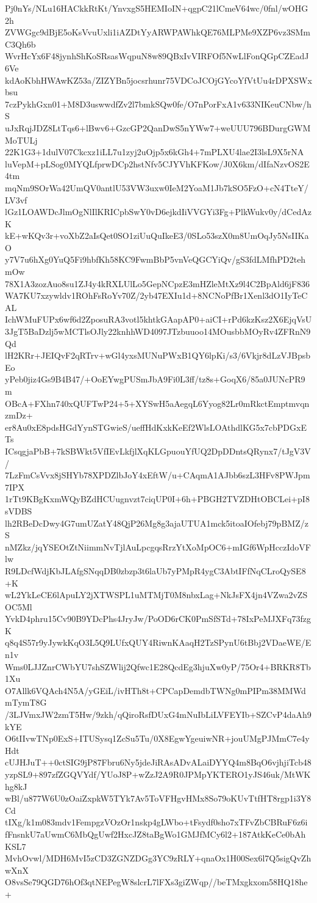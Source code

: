 Pj0nYs/NLu16HACkkRtKt/YnvxgS5HEMIoIN+qgpC21lCmeV64wc/0fnl/wOHG2h
ZVWGgc9dBjE5oKsVvuUxli1iAZDtYyARWPAWhkQE76MLPMe9XZP6vz3SMmC3Qh6b
WvrHcYx6F48jynhShKoSRsasWqpuN8w89QBxIvVIRFOf5NwLlFonQGpCZEadJ6Ve
kdAoKbhHWAwKZ53a/ZIZYBn5jocsrhunr75VDCoJCOjGYcoYfVtUu4rDPXSWxbsu
7czPykhGxn01+M8D3uswwdfZv2l7bmkSQw0fe/O7nPorFxA1v633NIKeuCNbw/hS
uJxRqjJDZ8LtTqs6+lBwv6+GzcGP2QanDwS5nYWw7+weUUU796BDurgGWMMoTULj
22K1G3+1dulV07Ckcxz1iLL7u1zyj2uOjp5x6kGh4+7mPLXU4lae2I3lsL9X5rNA
luVepM+pLSog0MYQLfprwDCp2hstNfv5CJYVhKFKow/J0X6km/dIfaNzvOS2E4tm
mqNm9SOrWa42UmQV0antlU53VW3uxw0IeM2YoaM1Jb7kSO5FzO+cN4TteY/LV3vf
lGz1LOAWDcJlmOgNlIlKRICpbSwY0vD6ejkdIiVVGYi3Fg+PlkWukv0y/dCedAzK
kE+wKQv3r+voXbZ2aIsQet0SO1ziUuQuIkeE3/0SLo53szX0m8UmOqJy5NsIIKaO
y7V7u6hXg0YuQ5Fi9hbfKh58KC9FwmBbP5vnVeQGCYiQv/gS3fdLMfhPD2tehmOw
78X1A3zozAuo8su1ZJ4y4kRXLUlLo5GepNCpzE3mHZleMtXz9l4C2BpAld6jF836
WA7KU7xzywldv1ROhFsRoYv70Z/2yb47EXIu1d+8NCNoPfBr1Xenl3dO1IyTeCAL
IchWMuFUPx6wf6d2ZposuRA3votl5khtkGAapAP0+aiCI+rPd6kzKsz2X6EjqVsU
3JgT5BaDzlj5wMCTlsOJly22knhhWD4097JTzbuuoo14MOusbbMOyRv4ZFRnN9Qd
lH2KRr+JEIQvF2qRTrv+wGl4yxsMUNuPWxB1QY6lpKi/s3/6Vkjr8dLzVJBpsbEo
yPeb0jiz4Gs9B4B47/+OoEYwgPUSmJbA9Fi0L3ff/tz8s+GoqX6/85a0JUNcPR9m
OBcA+FXhn740xQUFTwP24+5+XYSwH5aAegqL6Yyog82Lr0mRkctEmptmvqnzmDz+
er8Au0xE8pdsHGdYynSTGwieS/ueffHdKxkKeEf2WlsLOAthdlKG5x7cbPDGxETs
ICsqgjaPbB+7kSBWkt5VfIEvLkfjlXqKLGpuouYfUQ2DpDDntsQRynx7/tJgV3V/
7LzFmCsVvx8jSHYb78XPDZlbJoY4xEftW/u+CAqmA1AJbb6szL3HFv8PWJpm7IPX
1rTt9KBgKxmWQyBZdHCUugnvzt7ciqUP0I+6h+PBGH2TVZDHtOBCLei+pI8sVDBS
lh2RBeDcDwy4G7umUZatY48QjP26Mg8g3ajaUTUA1mck5itoaIOfebj79pBMZ/zS
nMZkz/jqYSEOtZtNiimmNvTjlAuLpcgqsRrzYtXoMpOC6+mIGf6WpHcczIdoVFlw
R9LDcfWdjKbJLAfgSNqqDB0zbzp3t6laUb7yPMpR4ygC3AbtIFfNqCLroQySE8+K
wL2YkLeCE6lApuLY2jXTWSPL1uMTMjT0M8nbxLag+NkJsFX4jn4VZwa2vZSOC5Ml
YvkD4phru15Cv90B9YDcPhs4JryJw/PoOD6rCK0PmSfSTd+78IxPeMJXFq73fzgK
q8q4S57r9yJywkKqO3L5Q9LUfxQUY4RiwnKAaqH2TzSPynU6tBbj2VDaeWE/En1v
Wms0LJJZnrCWbYU7shSZWlij2Qfwc1E28QcdEg3hjuXw0yP/75Or4+BRKR8Tb1Xu
O7Allk6VQAch4N5A/yGEiL/ivHTh8t+CPCapDemdbTWNg0mPIPm38MMWdmTymT8G
/3LJVmxJW2zmT5Hw/9zkh/qQiroRsfDUxG4mNuIbLiLVFEYIb+SZCvP4daAh9kYE
O6tIIvwTNp0ExS+ITUSysq1ZcSu5Tu/0X8EgwYgeuiwNR+jouUMgPJMmC7e4yHdt
cUJHJuT++0ctSIG9jP87Fbru6Ny5jdeJiRAsADvALaiDYYQ4m8BqO6vjhjiTcb48
yzpSL9+897zfZGQVYdf/YUoJ8P+wZzJ2A9R0JPMpYKTERO1yJS46uk/MtWKhg8kJ
wBl/u877W6U0zOaiZxpkW5TYk7Av5ToVFHgvHMx8So79oKUvTtfHT8rgp1i3Y8Cd
tIXg/k1m083mdv1FempgzVOzOr1nskp4gLWbo+tFsydf0sho7xTFvZbCBRuF6z6i
fFnsnkU7aUwmC6MbQgUwf2HxcJZ8taBgWo1GMJfMCy6l2+187AtkKeCe0bAhKSL7
MvhOvwl/MDH6MvI5zCD3ZGNZDGg3YC9zRLY+qnaOx1H00Sex6l7Q5sigQvZhwXnX
O8vsSe79QGD76hOf3qtNEPegW8slcrL7lFXs3giZWqp//beTMxgkxom58HQ18he+
